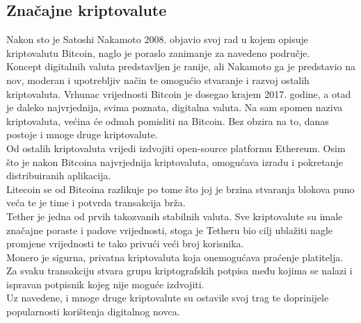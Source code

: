 \documentclass[12pt]{article}
\begin{document}
\subsection{Značajne kriptovalute}
Nakon sto je Satoshi Nakamoto 2008. objavio svoj rad u kojem opisuje kriptovalutu Bitcoin, naglo je poraslo zanimanje za navedeno područje.\cite{bitcoin} \\
Koncept digitalnih valuta predstavljen je ranije\cite{b-money}, ali Nakamoto ga je predstavio na nov, moderan i upotrebljiv način te omogućio stvaranje i razvoj ostalih kriptovaluta. 
Vrhunac vrijednosti Bitcoin je dosegao krajem 2017. godine, a otad je daleko najvrjednija, svima poznata, digitalna valuta. Na sam spomen naziva kriptovaluta, većina će odmah pomisliti na Bitcoin. Bez obzira na to, danas postoje i mnoge druge kriptovalute.\\
Od ostalih kriptovaluta vrijedi izdvojiti open-source platformu Ethereum. Osim što je nakon Bitcoina najvrjednija kriptovaluta, omogućava izradu i pokretanje distribuiranih aplikacija.\cite{ethereum} \\
Litecoin se od Bitcoina razlikuje po tome što joj je brzina stvaranja blokova puno veća te je time i potvrda transakcija brža. \cite{litecoin} \\
Tether je jedna od prvih takozvanih stabilnih valuta. Sve kriptovalute su imale značajne poraste i padove vrijednosti, stoga je Tetheru bio cilj ublažiti nagle promjene vrijednosti te tako privući veći broj korisnika.\cite{tether}\\
Monero je sigurna, privatna kriptovaluta koja onemogućava praćenje platitelja. Za svaku transakciju stvara grupu kriptografskih potpisa među kojima se nalazi i ispravan potpisnik kojeg nije moguće izdvojiti.\cite{monero}\\
Uz navedene, i mnoge druge kriptovalute su ostavile svoj trag te doprinijele popularnosti korištenja digitalnog novca.
\end{document}
